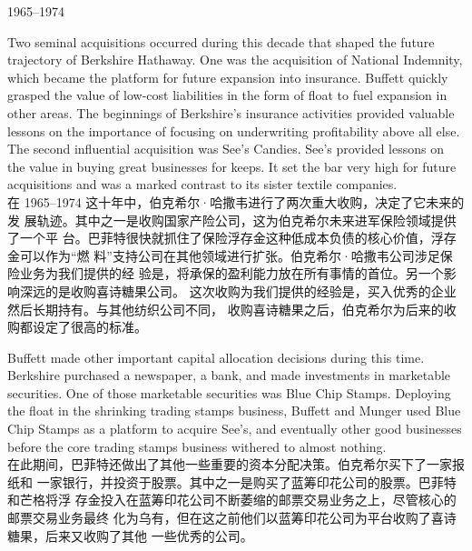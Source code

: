 \begin{section}{1965--1974}
\begin{verseparallel}
  {
    Two seminal acquisitions occurred during this decade that shaped the future
    trajectory of Berkshire Hathaway. One was the acquisition of National
    Indemnity, which became the platform for future expansion into insurance.
    Buffett quickly grasped the value of low-cost liabilities in the form of
    float to fuel expansion in other areas. The beginnings of Berkshire's
    insurance activities provided valuable lessons on the importance of focusing
    on underwriting profitability above all else. The second influential
    acquisition was See's Candies. See's provided lessons on the value in
    buying great businesses for keeps. It set the bar very high for future
    acquisitions and was a marked contrast to its sister textile companies. \\
  }
  {
    在 1965--1974 这十年中，伯克希尔·哈撒韦进行了两次重大收购，决定了它未来的发
    展轨迹。其中之一是收购国家产险公司，这为伯克希尔未来进军保险领域提供了一个平
    台。巴菲特很快就抓住了保险浮存金这种低成本负债的核心价值，浮存金可以作为“燃
    料”支持公司在其他领域进行扩张。伯克希尔·哈撒韦公司涉足保险业务为我们提供的经
    验是，将承保的盈利能力放在所有事情的首位。另一个影响深远的是收购喜诗糖果公司。
    这次收购为我们提供的经验是，买入优秀的企业然后长期持有。与其他纺织公司不同，
    收购喜诗糖果之后，伯克希尔为后来的收购都设定了很高的标准。
  }
\end{verseparallel}

\begin{verseparallel}
  {
    Buffett made other important capital allocation decisions during this time.
    Berkshire purchased a newspaper, a bank, and made investments in marketable
    securities. One of those marketable securities was Blue Chip Stamps.
    Deploying the float in the shrinking trading stamps business, Buffett and
    Munger used Blue Chip Stamps as a platform to acquire See's, and eventually
    other good businesses before the core trading stamps business withered to
    almost nothing. \\
  }
  {
    在此期间，巴菲特还做出了其他一些重要的资本分配决策。伯克希尔买下了一家报纸和
    一家银行，并投资于股票。其中之一是购买了蓝筹印花公司的股票。巴菲特和芒格将浮
    存金投入在蓝筹印花公司不断萎缩的邮票交易业务之上，尽管核心的邮票交易业务最终
    化为乌有，但在这之前他们以蓝筹印花公司为平台收购了喜诗糖果，后来又收购了其他
    一些优秀的公司。
  }
\end{verseparallel}


\end{section}
